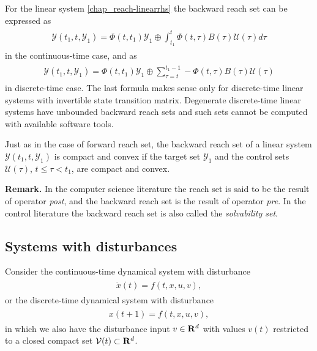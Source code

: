 \documentclass[letterpaper,10pt,english]{sphinxmanual}
\begin{document}
For the linear system \eqref{chap_reach-linearrhs} the backward reach set can be
expressed as
\label{chap_reach:equation-ctlsbrs}\begin{gather}
\begin{split}{\mathcal Y}(t_1, t, {\mathcal Y}_1) =
\Phi(t, t_1){\mathcal Y}_1 \oplus \int_{t_1}^t\Phi(t, \tau)B(\tau){\mathcal U}(\tau)d\tau\end{split}\label{chap_reach-ctlsbrs}
\end{gather}
in the continuous-time case, and as
\label{chap_reach:equation-dtlsbrs}\begin{gather}
\begin{split}{\mathcal Y}(t_1, t, {\mathcal Y}_1) =
\Phi(t, t_1){\mathcal Y}_1 \oplus \sum_{\tau =t}^{t_1-1}-\Phi(t, \tau)B(\tau){\mathcal U}(\tau)\end{split}\label{chap_reach-dtlsbrs}
\end{gather}
in discrete-time case. The last formula makes sense only for
discrete-time linear systems with invertible state transition matrix.
Degenerate discrete-time linear systems have unbounded backward reach
sets and such sets cannot be computed with available software tools.

Just as in the case of forward reach set, the backward reach set of a
linear system ${\mathcal Y}(t_1, t, {\mathcal Y}_1)$ is compact
and convex if the target set ${\mathcal Y}_1$ and the control sets
${\mathcal U}(\tau)$, $t\leqslant\tau<t_1$, are compact and
convex.

\textbf{Remark.} In the computer science literature the reach set is said to
be the result of operator \emph{post}, and the backward reach set is the
result of operator \emph{pre}. In the control literature the backward reach
set is also called the \emph{solvability set}.


\subsection{Systems with disturbances}
\label{chap_reach:systems-with-disturbances}
Consider the continuous-time dynamical system with disturbance
\label{chap_reach:equation-ctds2}\begin{gather}
\begin{split}\dot{x}(t) = f(t, x, u, v),\end{split}\label{chap_reach-ctds2}
\end{gather}
or the discrete-time dynamical system with disturbance
\label{chap_reach:equation-dtds2}\begin{gather}
\begin{split}x(t+1) = f(t, x, u, v),\end{split}\label{chap_reach-dtds2}
\end{gather}
in which we also have the disturbance input $v\in{\bf R}^d$ with
values $v(t)$ restricted to a closed compact set
${\mathcal V}(t)\subset{\bf R}^d$.
\end{document}
